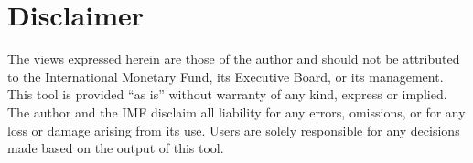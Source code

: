 \documentclass[11pt]{article}
\theoremstyle{plain}
\theoremstyle{remark}
\begin{document}
\section*{Disclaimer}

The views expressed herein are those of the author and should not be
attributed to the International Monetary Fund, its Executive Board, or
its management. This tool is provided ``as is'' without warranty of any
kind, express or implied. The author and the IMF disclaim all liability
for any errors, omissions, or for any loss or damage arising from its
use. Users are solely responsible for any decisions made based on the
output of this tool.

\clearpage


\end{document}
